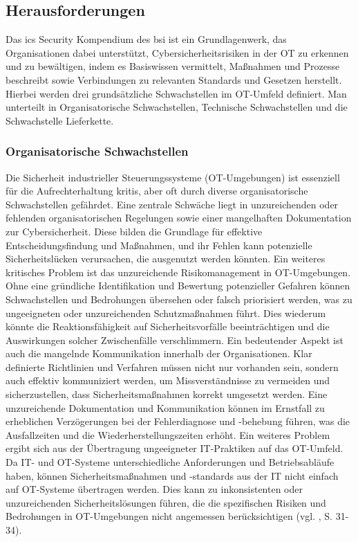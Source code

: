 \subsection{Herausforderungen}

Das \ac{ics} Security Kompendium des \ac{bsi} ist ein Grundlagenwerk, das Organisationen dabei unterstützt, Cybersicherheitsrisiken in der OT zu erkennen und zu bewältigen, indem es Basiswissen vermittelt, Maßnahmen und Prozesse beschreibt sowie Verbindungen zu relevanten Standards und Gesetzen herstellt. Hierbei werden drei grundsätzliche Schwachstellen im OT-Umfeld definiert. Man unterteilt in Organisatorische Schwachstellen, Technische Schwachstellen und die Schwachstelle Lieferkette. 

\subsubsection{Organisatorische Schwachstellen}

Die Sicherheit industrieller Steuerungssysteme (OT-Umgebungen) ist essenziell für die Aufrechterhaltung \ac{kritis}, aber oft durch diverse organisatorische Schwachstellen gefährdet. Eine zentrale Schwäche liegt in unzureichenden oder fehlenden organisatorischen Regelungen sowie einer mangelhaften Dokumentation zur Cybersicherheit. Diese bilden die Grundlage für effektive Entscheidungsfindung und Maßnahmen, und ihr Fehlen kann potenzielle Sicherheitslücken verursachen, die ausgenutzt werden könnten.
Ein weiteres kritisches Problem ist das unzureichende Risikomanagement in OT-Umgebungen. Ohne eine gründliche Identifikation und Bewertung potenzieller Gefahren können Schwachstellen und Bedrohungen übersehen oder falsch priorisiert werden, was zu ungeeigneten oder unzureichenden Schutzmaßnahmen führt. Dies wiederum könnte die Reaktionsfähigkeit auf Sicherheitsvorfälle beeinträchtigen und die Auswirkungen solcher Zwischenfälle verschlimmern. Ein bedeutender Aspekt ist auch die mangelnde Kommunikation innerhalb der Organisationen. Klar definierte Richtlinien und Verfahren müssen nicht nur vorhanden sein, sondern auch effektiv kommuniziert werden, um Missverständnisse zu vermeiden und sicherzustellen, dass Sicherheitsmaßnahmen korrekt umgesetzt werden. Eine unzureichende Dokumentation und Kommunikation können im Ernstfall zu erheblichen Verzögerungen bei der Fehlerdiagnose und -behebung führen, was die Ausfallzeiten und die Wiederherstellungszeiten erhöht. Ein weiteres Problem ergibt sich aus der Übertragung ungeeigneter IT-Praktiken auf das OT-Umfeld. Da IT- und OT-Systeme unterschiedliche Anforderungen und Betriebsabläufe haben, können Sicherheitsmaßnahmen und -standards aus der IT nicht einfach auf OT-Systeme übertragen werden. Dies kann zu inkonsistenten oder unzureichenden Sicherheitslösungen führen, die die spezifischen Risiken und Bedrohungen in OT-Umgebungen nicht angemessen berücksichtigen (vgl. \cite{ICS}, S. 31-34).

